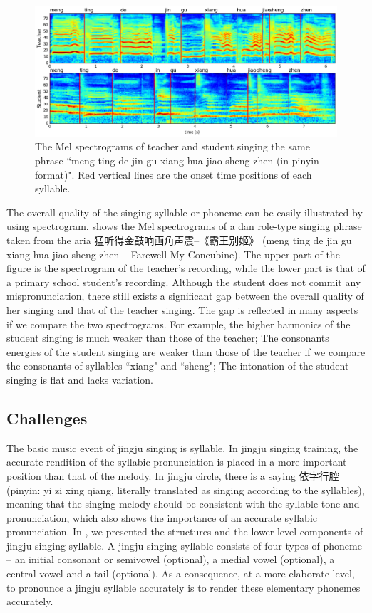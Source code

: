 \begin{figure}[ht!]
\includegraphics[width=\textwidth]{figs/spectro_vis/ch3_overall_qua.png}
\caption{The Mel spectrograms of teacher and student singing the same phrase ``meng ting de jin gu xiang hua jiao sheng zhen (in pinyin format)". Red vertical lines are the onset time positions of each syllable.}
\label{fig:overall_qua}
\end{figure}


The overall quality of the singing syllable or phoneme can be easily illustrated by using spectrogram.  shows the Mel spectrograms of a \gls{dan} role-type singing phrase taken from the aria 猛听得金鼓响画角声震--《霸王别姬》 (meng ting de jin gu xiang hua jiao sheng zhen -- Farewell My Concubine). The upper part of the figure is the spectrogram of the teacher's recording, while the lower part is that of a primary school student's recording. Although the student does not commit any mispronunciation, there still exists a significant gap between the overall quality of her singing and that of the teacher singing. The gap is reflected in many aspects if we compare the two spectrograms. For example, the higher harmonics of the student singing is much weaker than those of the teacher; The consonants energies of the student singing are weaker than those of the teacher if we compare the consonants of syllables ``xiang" and ``sheng"; The intonation of the student singing is flat and lacks variation. 

\subsection{Challenges}\label{sec:ch3:challenges}

The basic music event of jingju singing is syllable. In jingju singing training, the accurate rendition of the syllabic pronunciation is placed in a more important position than that of the melody. In jingju circle, there is a saying 依字行腔 (pinyin: yi zi xing qiang, literally translated as singing according to the syllables), meaning that the singing melody should be consistent with the syllable tone and pronunciation, which also shows the importance of an accurate syllabic pronunciation. In , we presented the structures and the lower-level components of jingju singing syllable. A jingju singing syllable consists of four types of phoneme -- an initial consonant or semivowel (optional), a medial vowel (optional), a central vowel and a tail (optional). As a consequence, at a more elaborate level, to pronounce a jingju syllable accurately is to render these elementary phonemes accurately.

